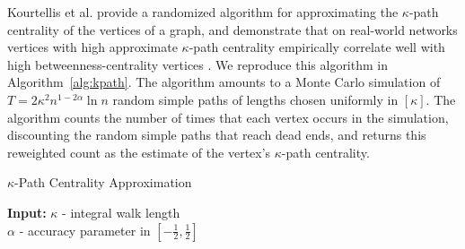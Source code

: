 \documentclass[10]{report}
\newcommand{\algoname}[1]{\textnormal{\textsc{#1}}}
\begin{document}
Kourtellis et al. provide a randomized algorithm for approximating the $\kappa$-path centrality of the vertices of a graph, and demonstrate that on real-world networks vertices with high approximate $\kappa$-path centrality empirically correlate well with high betweenness-centrality vertices \cite{kourtellis2013identifying}. 
We reproduce this algorithm in Algorithm~\ref{alg:kpath}.
The algorithm amounts to a Monte Carlo simulation of $T = 2 \kappa^2 n^{1-2\alpha} \ln n$ random simple paths of lengths chosen uniformly in $[\kappa]$.
The algorithm counts the number of times that each vertex occurs in the simulation, discounting the random simple paths that reach dead ends, and returns this reweighted count as the estimate of the vertex's $\kappa$-path centrality.


\begin{algorithm}[htbp] 
\caption{$\kappa$-Path Centrality Approximation}\label{alg:kpath}
\begin{flushleft}
        \textbf{Input:} 		$\kappa$ - integral walk length \\
        	\hspace{3.15em}	$\alpha$ - accuracy parameter in $\left [ -\frac{1}{2}, \frac{1}{2} \right ]$  \\

\end{flushleft}
\end{algorithm}
\end{document}
